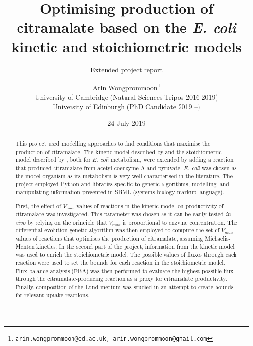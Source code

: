 \documentclass[parskip=full, numbers=noenddot]{scrreprt}
\author{Arin Wongprommoon\thanks{\texttt{arin.wongprommoon@ed.ac.uk, arin.wongprommoon@gmail.com}}
  \\University of Cambridge (Natural Sciences Tripos 2016-2019)
\\University of Edinburgh (PhD Candidate 2019 --)}
\title{Optimising production of citramalate based on the \emph{E. coli} kinetic and stoichiometric models}
\subtitle{Extended project report}
\date{24 July 2019}
\begin{document}
\maketitle

\tableofcontents

\begin{abstract}

  
  This project used modelling approaches to find conditions that maximise the production of citramalate. The kinetic model described by \citet{millard_metabolic_2017} and the stoichiometric model described by \citet{orth_comprehensive_2011}, both for \emph{E. coli} metabolism, were extended by adding a reaction that produced citramalate from acetyl coenzyme A and pyruvate. \emph{E. coli} was chosen as the model organism as its metabolism is very well characterised in the literature. The project employed Python and libraries specific to genetic algorithms, modelling, and manipulating information presented in SBML (systems biology markup language).
  
  First, the effect of $V_{max}$ values of reactions in the kinetic model on productivity of citramalate was investigated. This parameter was chosen as it can be easily tested \emph{in vivo} by relying on the principle that $V_{max}$ is proportional to enzyme concentration. The differential evolution genetic algorithm was then employed to compute the set of $V_{max}$ values of reactions that optimises the production of citramalate, assuming Michaelis-Menten kinetics. In the second part of the project, information from the kinetic model was used to enrich the stoichiometric model. The possible values of fluxes through each reaction were used to set the bounds for each reaction in the stoichiometric model. Flux balance analysis (FBA) was then performed to evaluate the highest possible flux through the citramalate-producing reaction as a proxy for citramalate productivity. Finally, composition of the Lund medium \citep{eastham_process_2015} was studied in an attempt to create bounds for relevant uptake reactions.
  
\end{abstract}
\end{document}

